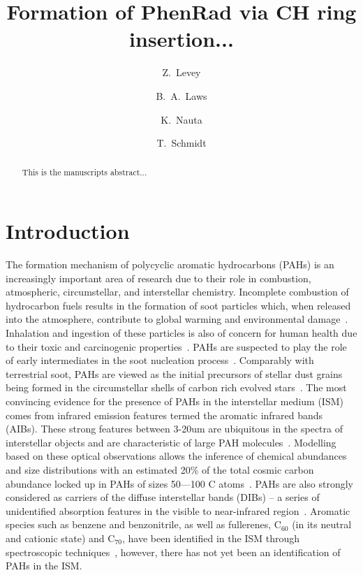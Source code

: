 \documentclass[journal=jacsat,manuscript=article,layout=onecolumn]{achemso}
\author{Z.~Levey}
\author{B.~A.~Laws}
\author{K.~Nauta}
\author{T.~Schmidt}
\affiliation{School of Chemistry, University of New South Wales, Sydney NSW 2052, Australia}
\title{Formation of PhenRad via CH ring insertion...}
\begin{document}
 
\begin{abstract} 
This is the manuscripts abstract...
\end{abstract} 

\section{Introduction}

The formation mechanism of polycyclic aromatic hydrocarbons (PAHs) is an increasingly important area of research due to their role in combustion, atmospheric, circumstellar, and interstellar chemistry. Incomplete combustion of hydrocarbon fuels results in the formation of soot particles which, when released into the atmosphere, contribute to global warming and environmental damage~\cite{bon13,ram08,shr10,fin97}. Inhalation and ingestion of these particles is also of concern for human health due to their toxic and carcinogenic properties~\cite{tiw15,tiw17,lah13,ame14}. PAHs are suspected to play the role of early intermediates in the soot nucleation process~\cite{fre02,wan11}. Comparably with terrestrial soot, PAHs are viewed as the initial precursors of stellar dust grains being formed in the circumstellar shells of carbon rich evolved stars~\cite{hen98,jag09,dra01,dra07}. The most convincing evidence for the presence of PAHs in the interstellar medium (ISM) comes from infrared emission features termed the aromatic infrared bands (AIBs). These strong features between 3-20um are ubiquitous in the spectra of interstellar objects and are characteristic of large PAH molecules~\cite{tie13,pec02}. Modelling based on these optical observations allows the inference of chemical abundances and size distributions with an estimated 20\% of the total cosmic carbon abundance locked up in PAHs of sizes 50—100 C atoms~\cite{tie08,dwe97}. PAHs are also strongly considered as carriers of the diffuse interstellar bands (DIBs) – a series of unidentified absorption features in the visible to near-infrared region~\cite{cox11}. Aromatic species such as benzene and benzonitrile, as well as fullerenes, C$_{60}$ (in its neutral and cationic state) and C$_{70}$, have been identified in the ISM through spectroscopic techniques~\cite{cer01,mcg18,cam10,cam15}, however, there has not yet been an identification of PAHs in the ISM. 
\end{document}
